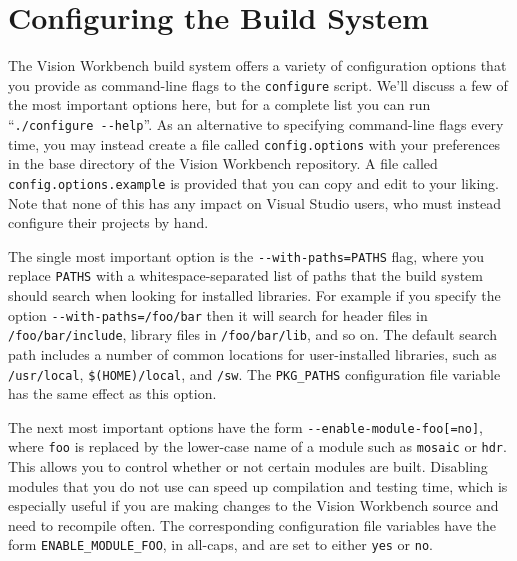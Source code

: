 \section{Configuring the Build System}\label{sec:config-build}

The Vision Workbench build system offers a variety of configuration
options that you provide as command-line flags to the \verb#configure#
script.  We'll discuss a few of the most important options here, but
for a complete list you can run ``\verb#./configure --help#''.  As an
alternative to specifying command-line flags every time, you may
instead create a file called \verb#config.options# with your
preferences in the base directory of the Vision Workbench repository.
A file called \verb#config.options.example# is provided that you can
copy and edit to your liking.  Note that none of this has any impact
on Visual Studio users, who must instead configure their projects by
hand.

The single most important option is the \verb#--with-paths=PATHS# 
flag, where you replace \verb#PATHS# with a whitespace-separated list of 
paths that the build system should search when looking for installed 
libraries.  For example if you specify the option \verb#--with-paths=/foo/bar# 
then it will search for header files in \verb#/foo/bar/include#, library 
files in \verb#/foo/bar/lib#, and so on.  The default search path includes 
a number of common locations for user-installed libraries, such as 
\verb#/usr/local#, \verb#$(HOME)/local#, and \verb#/sw#.  The \verb#PKG_PATHS# 
configuration file variable has the same effect as this option.

The next most important options have the form
\verb#--enable-module-foo[=no]#, where \verb#foo# is replaced by the
lower-case name of a module such as \verb#mosaic# or \verb#hdr#.  This
allows you to control whether or not certain modules are built.
Disabling modules that you do not use can speed up compilation and
testing time, which is especially useful if you are making changes to
the Vision Workbench source and need to recompile often.  The
corresponding configuration file variables have the form
\verb#ENABLE_MODULE_FOO#, in all-caps, and are set to either
\verb#yes# or \verb#no#.


